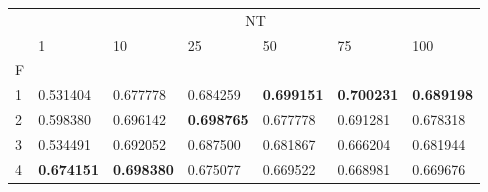 \begin{table}[htbp]
\centering
\label{nursery-results}
\begin{tabular}{lllllll}
\toprule
 & \multicolumn{6}{c}{NT} \\
 & 1 & 10 & 25 & 50 & 75 & 100 \\
F &  &  &  &  &  &  \\
\midrule
1 & 0.531404 & 0.677778 & 0.684259 & \textbf{0.699151} & \textbf{0.700231} & \textbf{0.689198} \\
2 & 0.598380 & 0.696142 & \textbf{0.698765} & 0.677778 & 0.691281 & 0.678318 \\
3 & 0.534491 & 0.692052 & 0.687500 & 0.681867 & 0.666204 & 0.681944 \\
4 & \textbf{0.674151} & \textbf{0.698380} & 0.675077 & 0.669522 & 0.668981 & 0.669676 \\
\bottomrule
\end{tabular}
\end{table}
